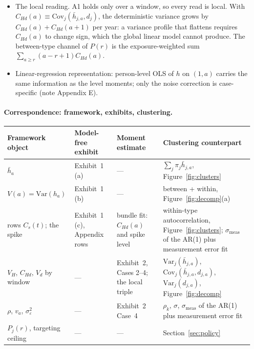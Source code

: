 \documentclass[11pt]{article}
\newcommand{\Var}{\mathrm{Var}}
\newcommand{\Cov}{\mathrm{Cov}}
\begin{document}
\begin{itemize}
\item The local reading. A1 holds only over a window, so every read is local. With $C_{Hd}(a)\equiv\Cov_j(\bar h_{j,a},d_j)$, the deterministic variance grows by $C_{Hd}(a)+C_{Hd}(a+1)$ per year: a variance profile that flattens requires $C_{Hd}(a)$ to change sign, which the global linear model cannot produce. The between-type channel of $P(r)$ is the exposure-weighted sum $\sum_{a\ge r}(a-r+1)C_{Hd}(a)$.
\item Linear-regression representation: person-level OLS of $h$ on $(1,a)$ carries the same information as the level moments; only the noise correction is case-specific (note Appendix E).
\end{itemize}

\paragraph{Correspondence: framework, exhibits, clustering.}
\begin{center}\footnotesize\setlength{\tabcolsep}{4pt}
\begin{tabular}{@{}p{3.3cm}p{4.2cm}p{4.2cm}p{3.2cm}@{}}
\toprule
Framework object & Model-free exhibit & Moment estimate & Clustering counterpart \\
\midrule
$\bar h_a$ & Exhibit~1 (a) & --- & $\sum_j\pi_j\bar h_{j,a}$, Figure~\ref{fig:clusters} \\
$V(a)=\Var(h_a)$ & Exhibit~1 (b) & --- & between + within, Figure~\ref{fig:decomp}(a) \\
rows $C_s(t)$; the spike & Exhibit~1 (c), Appendix rows & bundle fit: $C_{Hd}(a)$ and spike level & within-type autocorrelation, Figure~\ref{fig:clusters}; $\sigma_{\text{meas}}$ of the AR(1) plus measurement error fit \\
$V_H$, $C_{Hd}$, $V_d$ by window & --- & Exhibit~2, Cases 2--4; the local triple & $\Var_j(\bar h_{j,a})$, $\Cov_j(\bar h_{j,a},d_{j,a})$, $\Var_j(d_{j,a})$, Figure~\ref{fig:decomp} \\
$\rho$, $v_a$, $\sigma^2_\varepsilon$ & --- & Exhibit~2 Case~4 & $\rho_k$, $\sigma$, $\sigma_{\text{meas}}$ of the AR(1) plus measurement error fit \\
$P_j(r)$, targeting ceiling & --- & --- & Section~\ref{sec:policy} \\
\bottomrule
\end{tabular}
\end{center}
\end{document}
